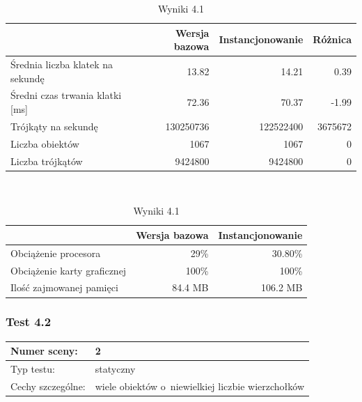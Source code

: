 \documentclass[a4paper,twoside,12pt]{book}
\begin{document}
\begin{table}[H]
    \centering
    \caption{Wyniki 4.1}
    \label{tab:instancing_test1}
    \begin{tabular}{|l||r|r|r|}
        \hline
        & Wersja bazowa & Instancjonowanie & Różnica \\
        \hline
        Średnia liczba klatek na sekundę & 13.82 & 14.21 & 0.39 \\
        \hline
        Średni czas trwania klatki [ms] & 72.36 & 70.37 & -1.99 \\
        \hline
        Trójkąty na sekundę & 130250736 & 122522400 & 3675672 \\
        \hline
        Liczba obiektów & 1067 & 1067 & 0 \\
        \hline
        Liczba trójkątów & 9424800 & 9424800 & 0 \\
        \hline
    \end{tabular} \\
    
    \vspace*{0.5 cm}
    
    \begin{tabular}{|l||r|r|}
         \hline
        & Wersja bazowa & Instancjonowanie \\
         \hline
        Obciążenie procesora & 29\% & 30.80\% \\
        \hline
        Obciążenie karty graficznej & 100\% & 100\% \\
        \hline
        Ilość zajmowanej pamięci & 84.4 MB & 106.2 MB \\
        \hline
    \end{tabular}
\end{table}

\subsubsection{Test 4.2}
\begin{tabular}{|l||l|}
\hline
Numer sceny: & 2 \\
\hline
Typ testu: & statyczny \\
\hline
Cechy szczególne: & wiele obiektów o~niewielkiej liczbie wierzchołków \\
\hline
\end{tabular}\\
\end{document}

